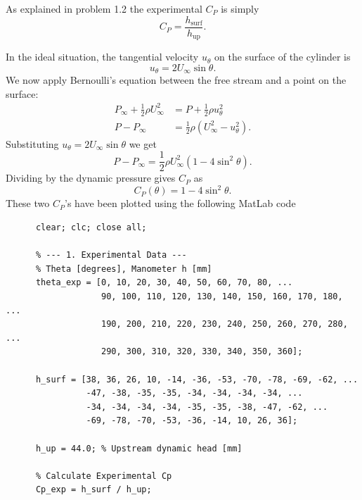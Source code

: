   \begin{derivation}
    As explained in problem 1.2 the experimental $C_P$ is simply
    \begin{equation*}
      C_{P} = \frac{h_{\mathrm{surf}}}{h_{\mathrm{up}}}
    .\end{equation*}
    
    In the ideal situation, the tangential velocity $u_{\theta}$ on the surface of the cylinder is
    \begin{equation*}
            u_{\theta} = 2 U_{\infty} \sin \theta
    .\end{equation*}
    We now apply Bernoulli's equation between the free stream and a point on the surface:
    \begin{align*}
      P_{\infty} + \frac{1}{2} \rho U^2_{\infty} &= P + \frac{1}{2} \rho u^2_{\theta} \\
      P - P_{\infty} &= \frac{1}{2} \rho \left( U^2_{\infty} - u_{\theta}^2 \right)
    .\end{align*}
    Substituting $u_{\theta} = 2U_{\infty} \sin \theta$ we get
    \begin{equation*}
      P - P_{\infty} = \frac{1}{2} \rho U^2_{\infty} \left( 1 - 4 \sin^2 \theta \right)
    .\end{equation*}
    Dividing by the dynamic pressure gives $C_P$ as
    \begin{equation*}
       C_P (\theta) = 1 - 4 \sin^2 \theta
    .\end{equation*}
    These two $C_P$'s have been plotted using the following MatLab code
    \begin{verbatim}
      clear; clc; close all;

      % --- 1. Experimental Data ---
      % Theta [degrees], Manometer h [mm]
      theta_exp = [0, 10, 20, 30, 40, 50, 60, 70, 80, ...
                   90, 100, 110, 120, 130, 140, 150, 160, 170, 180, ...
                   190, 200, 210, 220, 230, 240, 250, 260, 270, 280, ...
                   290, 300, 310, 320, 330, 340, 350, 360];

      h_surf = [38, 36, 26, 10, -14, -36, -53, -70, -78, -69, -62, ...
                -47, -38, -35, -35, -34, -34, -34, -34, ...
                -34, -34, -34, -34, -35, -35, -38, -47, -62, ...
                -69, -78, -70, -53, -36, -14, 10, 26, 36];

      h_up = 44.0; % Upstream dynamic head [mm]

      % Calculate Experimental Cp
      Cp_exp = h_surf / h_up;


\end{verbatim}
\end{derivation}
